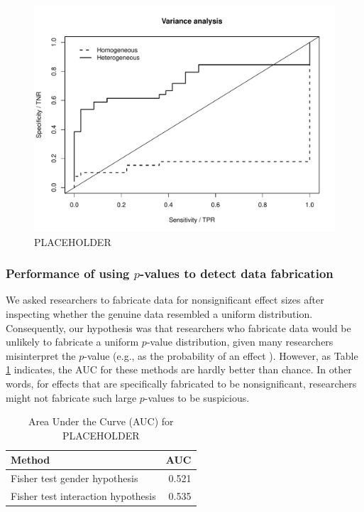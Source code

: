 \documentclass{article}
\begin{document}
\begin{figure}[!ht]
\begin{center}
\includegraphics[width=\textwidth,height=\textheight,keepaspectratio]{../figures/varianceplot.pdf}
\caption{PLACEHOLDER}
\label{varianceplot}
\end{center}
\end{figure}

\subsubsection*{Performance of using $p$-values to detect data fabrication}

We asked researchers to fabricate data for nonsignificant effect sizes after inspecting whether the genuine data resembled a uniform distribution. Consequently, our hypothesis was that researchers who fabricate data would be unlikely to fabricate a uniform $p$-value distribution, given many researchers misinterpret the $p$-value (e.g., as the probability of an effect %
). However, as Table \ref{auc_fisher} indicates, the AUC for these methods are hardly better than chance. In other words, for effects that are specifically fabricated to be nonsignificant, researchers might not fabricate such large $p$-values to be suspicious.

\begin{table}[ht]
\centering
\begin{tabular}{lr}
  \hline
Method & AUC \\ 
  \hline
Fisher test gender hypothesis & 0.521 \\ 
  Fisher test interaction hypothesis & 0.535 \\ 
   \hline
\end{tabular}
\caption{Area Under the Curve (AUC) for PLACEHOLDER} 
\label{auc_fisher}
\end{table}
\end{document}
